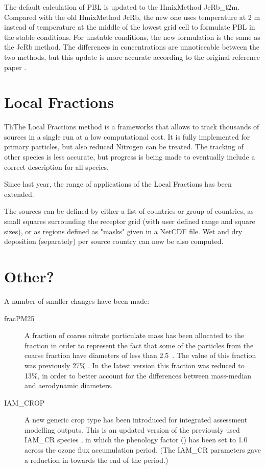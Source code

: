 The default calculation of PBL is updated to the HmixMethod JcRb\_t2m. Compared with the old HmixMethod JcRb, the new one uses temperature at 2 m instead of temperature at the middle of the lowest grid cell to formulate PBL in the stable conditions. For unstable conditions, the new formulation is the same as the JcRb method. The differences in concentrations are unnoticeable between the two methods, but this update is more accurate according to the original reference paper \citep{JcRb}.  


\section{Local Fractions}
\label{sec:updateLF}

ThThe Local Fractions method \citep{wind-2020} is a frameworks that allows to track thousands of sources in a single run at a low computational cost. It is fully implemented for primary particles, but also reduced Nitrogen can be treated. The tracking of other species is less accurate, but progress is being made to eventually include a correct description for all species.

Since last year, the range of applications of the Local Fractions has been extended.

The sources can be defined by either a list of countries or group of countries, as small squares surrounding the receptor grid (with user defined range and square sizes), or as regions defined as "masks" given in a NetCDF file.
Wet and dry deposition (separately) per source country can now be also computed.



\section{Other?}
\label{sec:updateOther}

A number of smaller changes have been made:

\begin{description}
  \item[fracPM25] A fraction of coarse nitrate particulate mass has been allocated to the \PM[2.5] fraction in order to represent the fact that some of the particles from the coarse fraction have diameters of less than 2.5~\um. The value of this fraction was previously 27\% \citep{Simpson:EMEP2012}. In the latest version this fraction was reduced to 13\%, in order to better account for the differences between mass-median and aerodynamic diameters.
  \item[IAM\_CROP] A new generic crop type has been introduced for integrated assessment modelling outputs. This is an updated version of the previously used IAM\_CR species \citep{Simpson:EMEP2012}, in which the phenology factor (\fphen) has been set to 1.0 across the ozone flux accumulation period. (The IAM\_CR parameters gave a reduction in \fphen towards the end of the period.)
\end{description}



